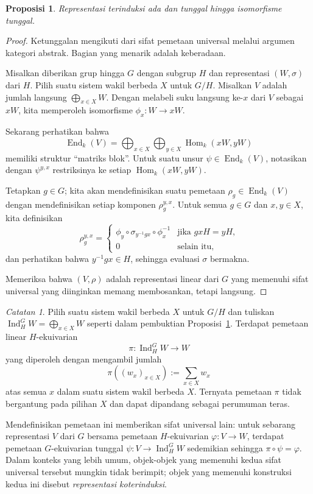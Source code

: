 \documentclass[12pt]{article}
\theoremstyle{plain}
\newtheorem{proposition}[theorem]{Proposisi}
\theoremstyle{definition}
\theoremstyle{remark}
\newtheorem{remark}[theorem]{Catatan}
\numberwithin{equation}{section}
\begin{document}
\begin{proposition} \label{prop:ind_construction}
Representasi terinduksi ada dan tunggal hingga isomorfisme tunggal.
\end{proposition}

\begin{proof}
Ketunggalan mengikuti dari sifat pemetaan universal melalui
argumen kategori abstrak. Bagian yang menarik adalah keberadaan.

Misalkan diberikan grup hingga $G$ dengan subgrup $H$ dan representasi
$(W,\sigma)$ dari $H$.
Pilih suatu sistem wakil berbeda $X$ untuk $G/H$.
Misalkan $V$ adalah jumlah langsung $\bigoplus_{x \in X} W$.
Dengan melabeli suku langsung ke-$x$ dari $V$ sebagai $xW$,
kita memperoleh isomorfisme $\phi_x : W \to xW$.

Sekarang perhatikan bahwa
\[
\operatorname{End}_k(V) = \bigoplus_{x \in X} \bigoplus_{y \in X}
\operatorname{Hom}_k(xW,yW)
\]
memiliki struktur ``matriks blok''.
Untuk suatu unsur $\psi \in \operatorname{End}_k(V)$,
notasikan dengan $\psi^{y,x}$ restriksinya ke setiap
$\operatorname{Hom}_k(xW,yW)$.

Tetapkan $g \in G$; kita akan mendefinisikan suatu pemetaan
$\rho_g \in \operatorname{End}_k(V)$ dengan mendefinisikan setiap komponen
$\rho_g^{y,x}$.
Untuk semua $g \in G$ dan $x,y \in X$, kita definisikan
\[
\rho_g^{y,x} =
\begin{cases}
\phi_y \circ \sigma_{y^{-1}gx} \circ \phi_x^{-1} & \textrm{jika $gxH=yH$,}\\
0 & \textrm{selain itu},
\end{cases}
\]
dan perhatikan bahwa $y^{-1}gx \in H$, sehingga evaluasi $\sigma$
bermakna.

Memeriksa bahwa $(V,\rho)$ adalah representasi linear dari $G$
yang memenuhi sifat universal yang diinginkan memang membosankan, tetapi langsung.
\end{proof}

\begin{remark}
Pilih suatu sistem wakil berbeda $X$ untuk $G/H$ dan
tuliskan $\operatorname{Ind}^G_H W = \bigoplus_{x \in X} W$
seperti dalam pembuktian Proposisi~\ref{prop:ind_construction}.
Terdapat pemetaan linear $H$-ekuivarian
\[
\pi : \operatorname{Ind}^G_H W \to W
\]
yang diperoleh dengan mengambil jumlah
\[
\pi\left( (w_x)_{x \in X} \right) :=
\sum_{x \in X} w_x
\]
atas semua $x$ dalam suatu sistem wakil berbeda $X$.
Ternyata pemetaan $\pi$ tidak bergantung pada pilihan $X$
dan dapat dipandang sebagai perumuman teras.

Mendefinisikan pemetaan ini memberikan sifat universal lain:
untuk sebarang representasi $V$ dari $G$ bersama pemetaan $H$-ekuivarian
$\varphi : V \to W$, terdapat pemetaan $G$-ekuivarian tunggal
$\psi : V \to \operatorname{Ind}^G_H W$ sedemikian sehingga
$\pi \circ \psi = \varphi$.
Dalam konteks yang lebih umum, objek-objek yang memenuhi kedua sifat universal
tersebut mungkin tidak berimpit; objek yang memenuhi
konstruksi kedua ini disebut \emph{representasi koterinduksi}.
\end{remark}
\end{document}
